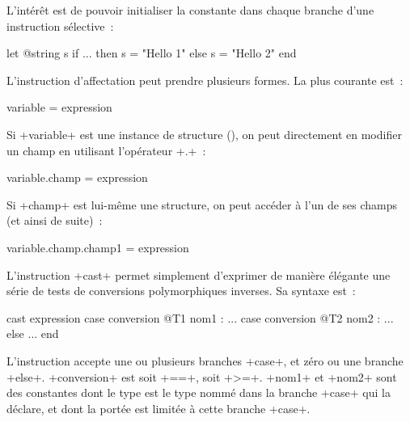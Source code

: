 L'intérêt est de pouvoir initialiser la constante dans chaque branche d'une instruction sélective~:
\begin{galgas3}
let @string s
if ... then
  s = "Hello 1"
else
  s = "Hello 2"
end
\end{galgas3}













L'instruction d'affectation peut prendre plusieurs formes. La plus courante est~:

\begin{galgas3box}
variable = expression
\end{galgas3box}

Si \ggst+variable+ est une instance de structure (), on peut directement en modifier un champ en utilisant l'opérateur \ggst+.+~:

\begin{galgas3box}
variable.champ = expression
\end{galgas3box}

Si \ggst+champ+ est lui-même une structure, on peut accéder à l'un de ses champs (et ainsi de suite)~:

\begin{galgas3box}
variable.champ.champ1 = expression
\end{galgas3box}














L'instruction \ggst+cast+ permet simplement d'exprimer de manière élégante une série de tests de conversions polymorphiques inverses. Sa syntaxe est~:

\begin{galgas3box}
cast expression
case conversion @T1 nom1 :
  ...
case conversion @T2 nom2 :
  ...
else
  ...
end
\end{galgas3box}

L'instruction accepte une ou plusieurs branches \ggst+case+, et zéro ou une branche \ggst+else+. \ggst+conversion+ est soit \ggst+==+, soit \ggst+>=+. \ggst+nom1+ et \ggst+nom2+ sont des constantes dont le type est le type nommé dans la branche \ggst+case+ qui la déclare, et dont la portée est limitée à cette branche \ggst+case+.

